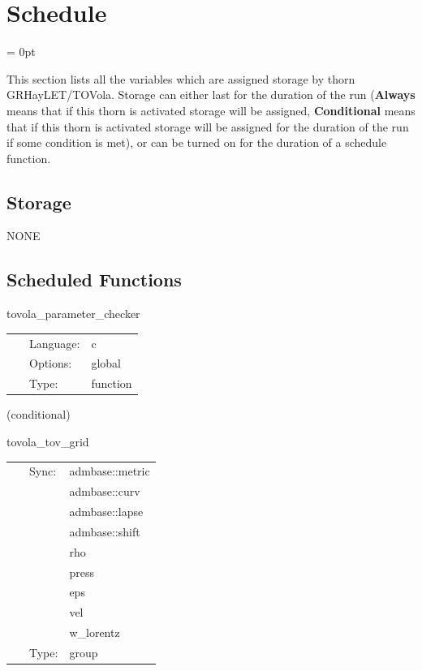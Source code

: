
\section{Schedule} 


\parskip = 0pt


\noindent This section lists all the variables which are assigned storage by thorn GRHayLET/TOVola.  Storage can either last for the duration of the run ({\bf Always} means that if this thorn is activated storage will be assigned, {\bf Conditional} means that if this thorn is activated storage will be assigned for the duration of the run if some condition is met), or can be turned on for the duration of a schedule function.


\subsection*{Storage}NONE
\subsection*{Scheduled Functions}
\vspace{5mm}


\hspace{5mm} tovola\_parameter\_checker 

\hspace{5mm}{\it check if parameters for tovola are valid. } 


\hspace{5mm}

 \begin{tabular*}{160mm}{cll} 
~ & Language:  & c \\ 
~ & Options:  & global \\ 
~ & Type:  & function \\ 
\end{tabular*} 


\vspace{5mm}

   (conditional) 

\hspace{5mm} tovola\_tov\_grid 

\hspace{5mm}{\it group for the tov initial data } 


\hspace{5mm}

 \begin{tabular*}{160mm}{cll} 
~ & Sync:  & admbase::metric \\ 
~& ~ &admbase::curv\\ 
~& ~ &admbase::lapse\\ 
~& ~ &admbase::shift\\ 
~& ~ &rho\\ 
~& ~ &press\\ 
~& ~ &eps\\ 
~& ~ &vel\\ 
~& ~ &w\_lorentz\\ 
~ & Type:  & group \\ 
\end{tabular*} 


